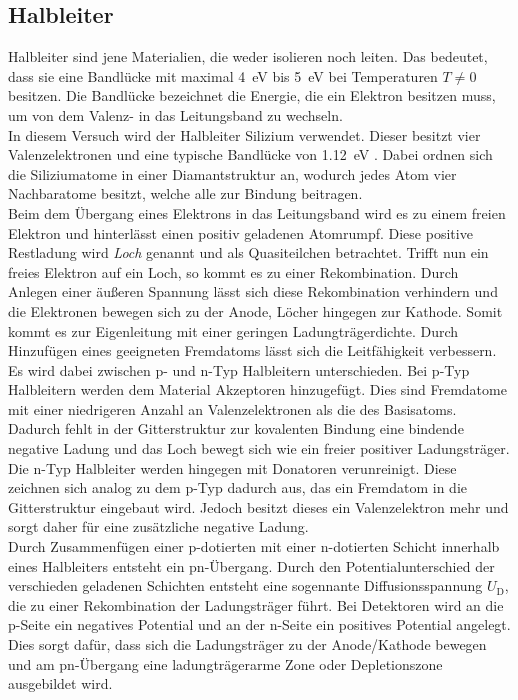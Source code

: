 \subsection{Halbleiter}
\label{sec:Halbleiter-Theorie}
Halbleiter sind jene Materialien, die weder isolieren noch leiten. Das bedeutet, dass sie eine Bandlücke mit maximal \SI{4}{\electronvolt} bis \SI{5}{\electronvolt} bei Temperaturen $T \neq 0$ besitzen. Die Bandlücke bezeichnet die Energie, die ein Elektron besitzen muss, um von dem Valenz- in das Leitungsband zu wechseln.\\
In diesem Versuch wird der Halbleiter Silizium verwendet. Dieser besitzt vier
Valenzelektronen und eine typische Bandlücke von \SI{1.12}{\electronvolt} \cite{chemie}. Dabei ordnen sich die Siliziumatome in einer Diamantstruktur an, wodurch jedes Atom vier Nachbaratome besitzt, welche alle zur Bindung
beitragen.\\
Beim dem Übergang eines Elektrons in das Leitungsband wird es zu einem freien Elektron und hinterlässt einen positiv geladenen Atomrumpf. Diese positive Restladung wird \textit{Loch} genannt und als Quasiteilchen betrachtet. Trifft nun ein freies Elektron auf ein Loch, so kommt es zu einer Rekombination. Durch Anlegen einer äußeren Spannung lässt sich diese Rekombination verhindern und die Elektronen bewegen sich zu der Anode, Löcher hingegen zur Kathode. Somit kommt es zur Eigenleitung mit einer geringen Ladungträgerdichte.
Durch Hinzufügen eines geeigneten Fremdatoms lässt sich die Leitfähigkeit verbessern. Es wird dabei zwischen p- und n-Typ Halbleitern unterschieden.
Bei p-Typ Halbleitern werden dem Material Akzeptoren hinzugefügt. Dies sind Fremdatome mit einer niedrigeren Anzahl an Valenzelektronen als die des Basisatoms. Dadurch fehlt in der Gitterstruktur zur kovalenten Bindung eine bindende negative Ladung und das Loch bewegt sich wie ein freier positiver Ladungsträger.
Die n-Typ Halbleiter werden hingegen mit Donatoren verunreinigt. Diese zeichnen sich analog zu dem p-Typ dadurch aus, das ein Fremdatom in die Gitterstruktur eingebaut wird. Jedoch besitzt dieses ein Valenzelektron mehr und sorgt daher für eine zusätzliche negative Ladung.\\
Durch Zusammenfügen einer p-dotierten mit einer n-dotierten Schicht innerhalb eines Halbleiters entsteht ein pn-Übergang. Durch den Potentialunterschied der verschieden geladenen Schichten entsteht eine sogennante Diffusionsspannung $U_\text{D}$, die zu einer Rekombination der Ladungsträger führt. Bei Detektoren wird an die p-Seite ein negatives Potential und an der n-Seite ein positives Potential angelegt. Dies sorgt dafür, dass sich die Ladungsträger zu der Anode/Kathode bewegen und am pn-Übergang eine ladungträgerarme Zone oder Depletionszone ausgebildet wird.
